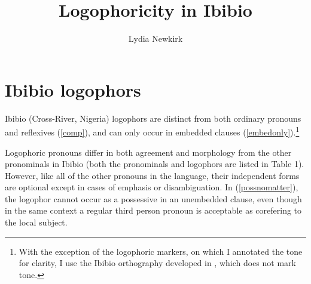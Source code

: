 \documentclass[output=paper]{langscibook}
\author{Lydia Newkirk\affiliation{Rutgers University}}
\title{Logophoricity in Ibibio}
\begin{document}
\section{Ibibio logophors}

Ibibio (Cross-River, Nigeria) logophors are distinct from both ordinary pronouns and reflexives (\ref{comp}), and can only occur in embedded clauses (\ref{embedonly}).\footnote{With the exception of the logophoric markers, on which I annotated the tone for clarity, I use the Ibibio orthography developed in \citet{Essien1990}, which does not mark tone.}

\begin{exe}
\ex\label{comp} \begin{xlist}
		\label{pro}
		\label{refl}
	\end{xlist}
	
	\ex\label{embedonly} \begin{xlist}
		\label{possnomatter}
	\label{nomat}
	\end{xlist}
\end{exe}
Logophoric pronouns differ in both agreement and morphology from the other pronominals in Ibibio (both the pronominals and logophors are listed in Table 1). However, like all of the other pronouns in the language, their independent forms are optional except in cases of emphasis or disambiguation. In (\ref{possnomatter}), the logophor cannot occur as a possessive in an unembedded clause, even though in the same context a regular third person pronoun is acceptable as corefering to the local subject.
\end{document}
